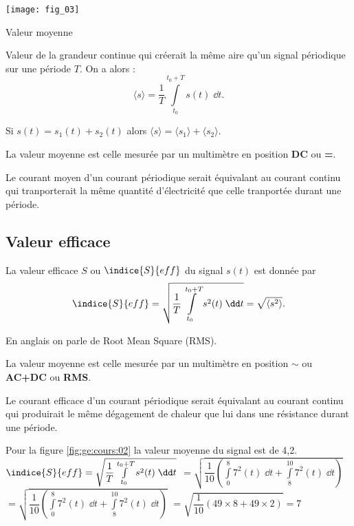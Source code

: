 \begin{marginfigure}
\texttt{[image: fig\_03]}
\caption{Valeur moyenne\label{fig:ge:cours:03}}
\end{marginfigure}

\begin{defi}
Valeur de la grandeur continue qui créerait la même aire qu'un signal périodique sur une période $T$.
On a alors : 
$$\langle s \rangle = \dfrac{1}{T} \int\limits_{t_0}^{t_0+T} s(t)\; \dd t.$$
\end{defi}

\begin{prop}
Si $s(t) = s_1(t)+s_2(t)$ alors  $\langle s \rangle = \langle s_1 \rangle+\langle s_2 \rangle$.
\end{prop}

La valeur moyenne est celle mesurée par un multimètre en position \textbf{DC} ou \textbf{=}.

Le courant moyen d'un courant périodique serait équivalant au courant continu qui tranporterait la même quantité d'électricité que celle tranportée durant une période.

\subsection{Valeur efficace}
\begin{defi}
La valeur efficace $S$ ou $\indice{S}{eff}$ du signal $s(t)$ est donnée par  
$$\indice{S}{eff} = \sqrt{\dfrac{1}{T} \int\limits_{t_0}^{t_0+T} s^2(t)\; \dd t} = \sqrt{\langle s^2 \rangle}.$$

En anglais on parle de Root Mean Square (RMS).
\end{defi}


La valeur moyenne est celle mesurée par un multimètre en position $\sim$ 
ou \textbf{AC+DC} ou \textbf{RMS}.

Le courant efficace d'un courant périodique serait équivalant au courant continu qui produirait le même dégagement de chaleur que lui dans une résistance durant une période.

Pour la figure \ref{fig:ge:cours:02} la valeur moyenne du signal est de 4,2.
$\indice{S}{eff} = \sqrt{\dfrac{1}{T} \int\limits_{t_0}^{t_0+T} s^2(t)\; \dd t}$
$=\sqrt{\dfrac{1}{10} \left( \int\limits_{0}^{8} 7^2(t)\; \dd t + \int\limits_{8}^{10} 7^2(t)\; \dd t\right)}$
$=\sqrt{\dfrac{1}{10} \left( \int\limits_{0}^{8} 7^2(t)\; \dd t + \int\limits_{8}^{10} 7^2(t)\; \dd t\right)}$
$=\sqrt{\dfrac{1}{10} \left( 49 \times 8 + 49 \times 2\right)}=7$



